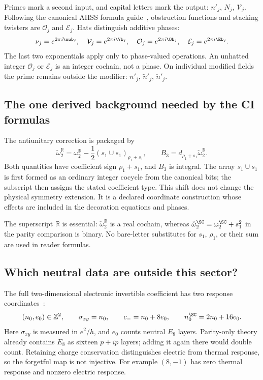 Primes mark a second input, and capital letters mark the output: $n'_j$, $N_j$, $\mathcal V_j$. Following the canonical AHSS formula guide~\cite{AHSSGuide}, obstruction functions and stacking twisters are $\mathcal O_j$ and $\mathcal E_j$. Hats distinguish additive phases:
\begin{equation}\label{eq:phase-convention}
 \nu_j=e^{2\pi i\nub_j},\quad
 \mathcal V_j=e^{2\pi i\Vb_j},\quad
 \mathcal O_j=e^{2\pi i\Ob_j},\quad
 \mathcal E_j=e^{2\pi i\Eb_j}.
\end{equation}
The last two exponentials apply only to phase-valued operations. An unhatted integer $\mathcal O_j$ or $\mathcal E_j$ is an integer cochain, not a phase. On individual modified fields the prime remains outside the modifier: $\bar n'_j$, $\widetilde n'_j$, $\check n'_j$.

\subsection{The one derived background needed by the CI formulas}
The antiunitary correction is packaged by
\begin{equation}\label{eq:AB}
 \boxed{\displaystyle
 \check\omega_2^{\mathbb R}
 =\omega_2^{\mathbb R}-\frac12(s_1\cup s_1)_{\rho_1+s_1},
 \qquad B_3=d_{\rho_1+s_1}\check\omega_2^{\mathbb R}.}
\end{equation}
Both quantities have coefficient sign $\rho_1+s_1$, and $B_3$ is integral. The array $s_1\cup s_1$ is first formed as an ordinary integer cocycle from the canonical bits; the subscript then assigns the stated coefficient type. This shift does not change the physical symmetry extension. It is a declared coordinate construction whose effects are included in the decoration equations and phases.

The superscript $\mathbb R$ is essential: $\check\omega_2^{\mathbb R}$ is a real cochain, whereas $\check\omega_2^{\SC}=\omega_2^{\SC}+s_1^2$ in the parity comparison is binary. No bare-letter substitutes for $s_1$, $\rho_1$, or their sum are used in reader formulas.

\subsection{Which neutral data are outside this sector?}
The full two-dimensional electronic invertible coefficient has two response coordinates~\cite{BCHM}:
\begin{equation}\label{eq:neutral-coefficient}
 (n_0,e_0)\in\mathbb Z^2,\qquad
 \sigma_{xy}=n_0,\qquad c_-=n_0+8e_0,\qquad
 n_0^{\SC}=2n_0+16e_0.
\end{equation}
Here $\sigma_{xy}$ is measured in $e^2/h$, and $e_0$ counts neutral $E_8$ layers. Parity-only theory already contains $E_8$ as sixteen $p+ip$ layers; adding it again there would double count. Retaining charge conservation distinguishes electric from thermal response, so the forgetful map is not injective. For example $(8,-1)$ has zero thermal response and nonzero electric response.

